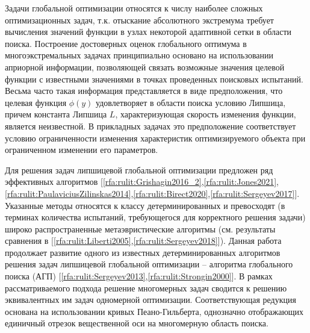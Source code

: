 \documentclass[10pt,a4paper]{book}
\begin{document}

Задачи глобальной оптимизации относятся к числу наиболее сложных оптимизационных задач, т.к. отыскание абсолютного экстремума требует вычисления значений функции в узлах некоторой адаптивной сетки в области поиска. 
Построение достоверных оценок глобального оптимума в многоэкстремальных задачах принципиально основано на использовании априорной информации, позволяющей связать возможные значения целевой функции с известными значениями в точках проведенных поисковых испытаний.
Весьма часто такая информация представляется в виде предположения, что целевая функция $\phi(y)$ удовлетворяет в области поиска условию Липшица, причем константа Липшица $L$, характеризующая скорость изменения функции, является неизвестной. В прикладных задачах это предположение соответствует условию ограниченности изменения характеристик оптимизируемого объекта при ограниченном изменении его параметров. 

Для решения задач липшицевой глобальной оптимизации предложен ряд эффективных алгоритмов 
[\ref{rfa:rulit:Grishagin2016_2},\ref{rfa:rulit:Jones2021},\ref{rfa:rulit:PaulaviciusZilinskas2014},\ref{rfa:rulit:Birect2020},\ref{rfa:rulit:Sergeyev2017}]. Указанные методы относятся к классу детерминированных и превосходят (в терминах количества испытаний, требующегося для корректного решения задачи) широко распространенные метаэвристические алгоритмы (см. результаты сравнения в [\ref{rfa:rulit:Liberti2005},\ref{rfa:rulit:Sergeyev2018}]).
Данная работа продолжает развитие одного из известных детерминированных алгоритмов решения задач липшицевой глобальной оптимизации -- алгоритма глобального поиска (АГП) [\ref{rfa:rulit:Sergeyev2013},\ref{rfa:rulit:Strongin2000}]. В рамках рассматриваемого подхода решение многомерных задач сводится к решению эквивалентных им задач одномерной оптимизации. Соответствующая редукция основана на использовании кривых Пеано-Гильберта, однозначно отображающих единичный отрезок вещественной оси на многомерную область поиска. 
 
\end{document}
